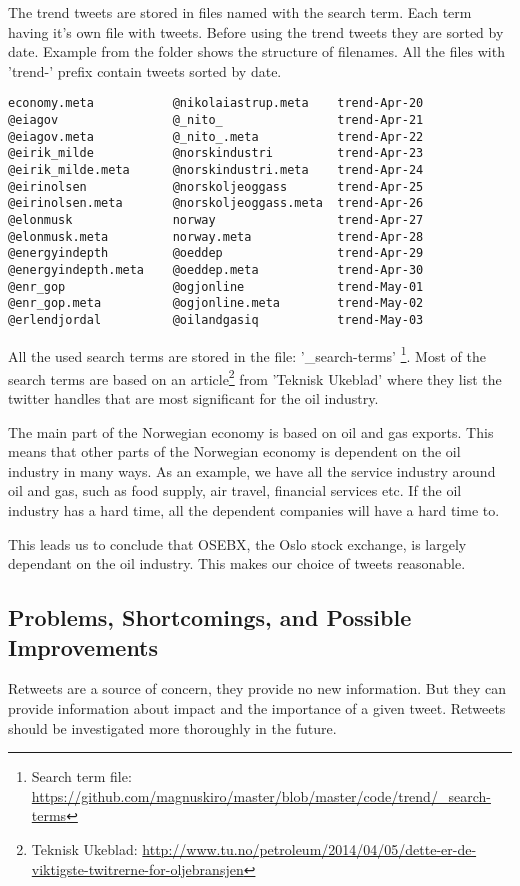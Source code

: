 The trend tweets are stored in files named with the search term. Each term
having it's own file with tweets. Before using the trend tweets they are sorted
by date. Example from the folder shows the structure of filenames. All the files
with 'trend-' prefix contain tweets sorted by date.   
\begin{verbatim}
economy.meta           @nikolaiastrup.meta    trend-Apr-20
@eiagov                @_nito_                trend-Apr-21
@eiagov.meta           @_nito_.meta           trend-Apr-22
@eirik_milde           @norskindustri         trend-Apr-23
@eirik_milde.meta      @norskindustri.meta    trend-Apr-24
@eirinolsen            @norskoljeoggass       trend-Apr-25
@eirinolsen.meta       @norskoljeoggass.meta  trend-Apr-26
@elonmusk              norway                 trend-Apr-27
@elonmusk.meta         norway.meta            trend-Apr-28
@energyindepth         @oeddep                trend-Apr-29
@energyindepth.meta    @oeddep.meta           trend-Apr-30
@enr_gop               @ogjonline             trend-May-01
@enr_gop.meta          @ogjonline.meta        trend-May-02
@erlendjordal          @oilandgasiq           trend-May-03
\end{verbatim}

All the used search terms are stored in the file: '\_search-terms'
\footnote{Search term file:
\url{https://github.com/magnuskiro/master/blob/master/code/trend/_search-terms}}.
Most of the search terms are based on an article\footnote{Teknisk Ukeblad:
\url{http://www.tu.no/petroleum/2014/04/05/dette-er-de-viktigste-twitrerne-for-oljebransjen}}
from 'Teknisk Ukeblad' where they list the twitter handles that are most
significant for the oil industry.

The main part of the Norwegian economy is based on oil and gas exports. This
means that other parts of the Norwegian economy is dependent on the oil
industry in many ways. As an example, we have all the service industry around
oil and gas, such as food supply, air travel, financial services etc. If the
oil industry has a hard time, all the dependent companies will have a hard time
to. 
 
This leads us to conclude that OSEBX, the Oslo stock exchange, is largely
dependant on the oil industry. This makes our choice of tweets
reasonable. 
%

\subsection{Problems, Shortcomings, and Possible Improvements}
Retweets are a source of concern, they provide no new information. But they can
provide information about impact and the importance of a given tweet. Retweets
should be investigated more thoroughly in the future.  

